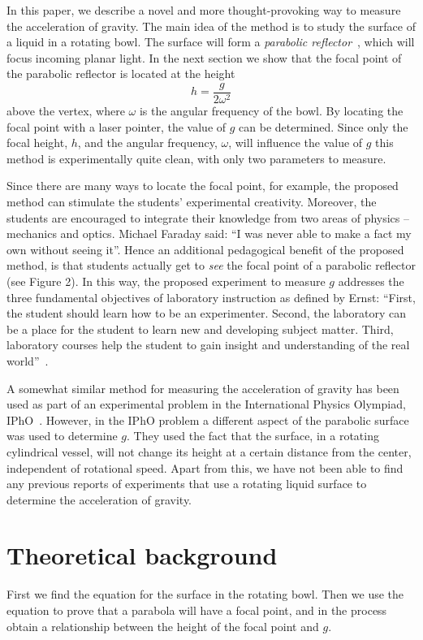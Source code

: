 \documentclass[11pt, a4paper, twocolumn, swedish, english]{article}
\begin{document}
In this paper, we describe a novel and more thought-provoking way to
measure the acceleration of gravity. The main idea of the method is to
study the surface of a liquid in a rotating bowl. The surface will
form a \emph{parabolic reflector}~\cite{Berg1990}, which will focus
incoming planar light. In the next section we show that the focal
point of the parabolic reflector is located at the height
\begin{equation}
h=\frac{g}{2\omega^2}
\end{equation}
above the vertex, where $\omega$ is the angular
frequency of the bowl. By locating the focal point with a laser pointer, the value of $g$ can be determined.
Since only the focal height, $h$, and the angular
frequency, $\omega$, will influence the value of $g$ this method
is experimentally quite clean, with only two parameters to measure. 

Since there are many ways to locate the focal point, for example, 
the proposed method can stimulate the students' experimental creativity.
Moreover, the students are encouraged to integrate their knowledge 
from two areas of physics -- mechanics and optics. Michael Faraday 
said: ``I was never able to make a fact my own without seeing it''.
Hence an additional pedagogical benefit of the proposed method, is that students
actually get to \emph{see} the focal point of a parabolic reflector (see Figure 2).
In this way, the proposed experiment to measure $g$ addresses the three fundamental objectives
of laboratory instruction as defined by Ernst:
``First, the student should learn how to be an experimenter.
Second, the laboratory can be a place for the student
to learn new and developing subject matter. Third, laboratory
courses help the student to gain insight and understanding of
the real world''~\cite{Ernst1983}.

A somewhat similar method for measuring the acceleration of gravity has been used as part of an experimental
problem in the International Physics Olympiad,
IPhO~\cite{IPhO2001}. However, in the IPhO problem a
different aspect of the parabolic surface was used
to determine $g$. They used the fact that the surface, in a rotating cylindrical vessel, will not change its height at a certain distance from the center, independent of rotational speed. Apart from this, we have not been able to find any previous reports of experiments that use a rotating liquid surface to
determine the acceleration of gravity.

\section{Theoretical background}
First we find the equation for the surface in the rotating bowl. Then we use the equation to prove that a parabola will have a focal point, and in the process obtain a relationship between the height of the focal point and $g$.
\end{document}
